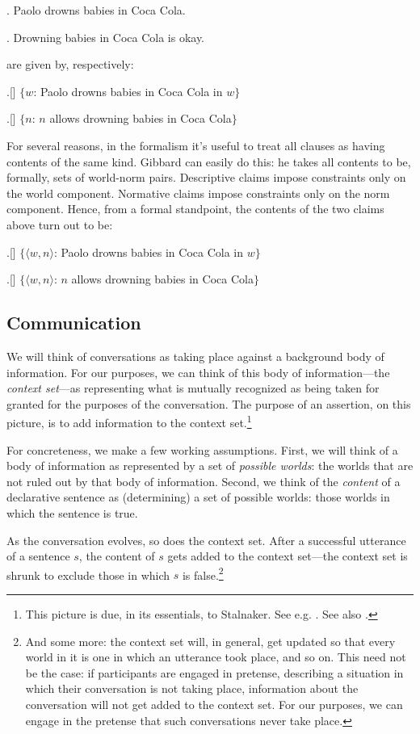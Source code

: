\documentclass[11pt,article,oneside]{memoir}
\begin{document}
\ex. Paolo drowns babies in Coca Cola.

\ex. Drowning babies in Coca Cola is okay.

are given by, respectively:

\ex.[] $\lbrace$$w$: Paolo drowns babies in Coca Cola in $w$$\rbrace$

\ex.[] $\lbrace$$n$: $n$ allows drowning babies in Coca Cola$\rbrace$

For several reasons, in the formalism it's useful to treat all clauses as having contents of the same kind. Gibbard can easily do this: he takes all contents to be, formally, sets of world-norm pairs. Descriptive claims impose constraints only on the world component. Normative claims impose constraints only on the norm component. Hence, from a formal standpoint, the contents of the two claims above turn out to be:

\ex.[] $\lbrace$$\langle w, n \rangle$: Paolo drowns babies in Coca Cola in $w$$\rbrace$

\ex.[] $\lbrace$$\langle w, n \rangle$: $n$ allows drowning babies in Coca Cola$\rbrace$


\subsection{Communication}

We will think of conversations as taking place against a background body of information. For our purposes, we can think of this body of information---the \emph{context set}---as representing what is mutually recognized as being taken for granted for the purposes of the conversation. The purpose of an assertion, on this picture, is to add information to the context set.\footnote{This picture is due, in its essentials, to Stalnaker. See  e.g. \citealt{stalnaker1973,stalnaker1978}. See also \citealt{lewis1979a}.}

For concreteness, we make a few working assumptions. First, we will think of a body of information as represented by a set of \emph{possible worlds}: the worlds that are not ruled out by that body of information. Second, we think of the \emph{content} of a declarative sentence as (determining) a set of possible worlds: those worlds in which the sentence is true. 

As the conversation evolves, so does the context set. After a successful utterance of a sentence $s$, the content of $s$ gets added to the context set---the context set is shrunk to exclude those in which $s$ is false.\footnote{And some more: the context set will, in general, get updated so that every world in it is one in which an utterance took place, and so on. This need not be the case: if participants are engaged in pretense, describing a situation in which their conversation is not taking place, information about the conversation will not get added to the context set. For our purposes, we can engage in the pretense that such conversations never take place.} 
\end{document}
